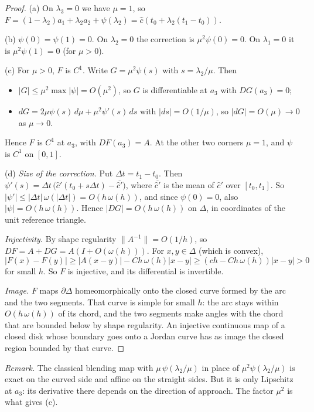\documentclass[preprint,12pt]{elsarticle}
\theoremstyle{definition}
\theoremstyle{remark}
\begin{document}
\begin{proof}
(a) On $\lambda_3=0$ we have $\mu=1$, so $F=(1-\lambda_2)a_1+\lambda_2a_2+\psi(\lambda_2)=\hat c(t_0+\lambda_2(t_1-t_0))$.

(b) $\psi(0)=\psi(1)=0$. On $\lambda_2=0$ the correction is $\mu^2\psi(0)=0$. On $\lambda_1=0$ it is
$\mu^2\psi(1)=0$ (for $\mu>0$).

(c) For $\mu>0$, $F$ is $C^1$. Write $G=\mu^2\psi(s)$ with $s=\lambda_2/\mu$. Then
\begin{itemize}
\item $|G|\le\mu^2\max|\psi|=O(\mu^2)$, so $G$ is differentiable at $a_3$ with $DG(a_3)=0$;
\item $dG=2\mu\psi(s)\,d\mu+\mu^2\psi'(s)\,ds$ with $|ds|=O(1/\mu)$, so $|dG|=O(\mu)\to0$ as $\mu\to0$.
\end{itemize}
Hence $F$ is $C^1$ at $a_3$, with $DF(a_3)=A$. At the other two corners $\mu=1$, and $\psi$ is $C^1$ on $[0,1]$.

(d) \emph{Size of the correction.} Put $\Delta t=t_1-t_0$. Then $\psi'(s)=\Delta t\,\bigl(\hat c'(t_0+s\Delta t)-\overline{\hat
c'}\bigr)$, where $\overline{\hat c'}$ is the mean of $\hat c'$ over $[t_0,t_1]$. So $|\psi'|\le|\Delta t|\,\omega(|\Delta
t|)=O(h\,\omega(h))$, and since $\psi(0)=0$, also $|\psi|=O(h\,\omega(h))$. Hence $|DG|=O(h\,\omega(h))$ on $\Delta$, in
coordinates of the unit reference triangle.

\emph{Injectivity.} By shape regularity $\|A^{-1}\|=O(1/h)$, so $DF=A+DG=A(I+O(\omega(h)))$. For $x,y\in\Delta$ (which is
convex),
\[
|F(x)-F(y)|\ge|A(x-y)|-Ch\,\omega(h)|x-y|\ge(ch-Ch\,\omega(h))|x-y|>0
\]
for small $h$. So $F$ is injective, and its differential is invertible.

\emph{Image.} $F$ maps $\partial\Delta$ homeomorphically onto the closed curve formed by the arc and the two segments.
That curve is simple for small $h$: the arc stays within $O(h\,\omega(h))$ of its chord, and the two segments make
angles with the chord that are bounded below by shape regularity. An injective continuous map of a closed disk whose
boundary goes onto a Jordan curve has as image the closed region bounded by that curve.
\end{proof}

\emph{Remark.} The classical blending map with $\mu\,\psi(\lambda_2/\mu)$ in place of $\mu^2\psi(\lambda_2/\mu)$ is
exact on the curved side and affine on the straight sides. But it is only Lipschitz at $a_3$: its derivative there
depends on the direction of approach. The factor $\mu^2$ is what gives (c).
\end{document}

